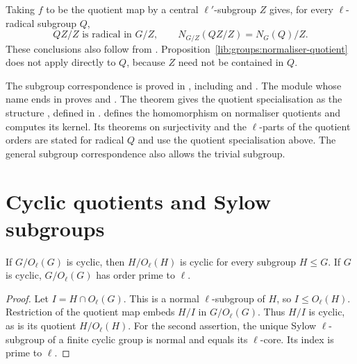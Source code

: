 Taking $f$ to be the quotient map by a central $\ell'$-subgroup $Z$
gives, for every $\ell$-radical subgroup $Q$,
\[
 QZ/Z\text{ is radical in }G/Z,
 \qquad N_{G/Z}(QZ/Z)=N_G(Q)/Z.
\]
These conclusions also follow from
\cite[Lemma~2.3(c) and its proof]{NavarroTiep2011}.
Proposition~\ref{lib:groups:normaliser-quotient} does not apply directly
to $Q$, because $Z$ need not be contained in $Q$.

\begin{implementation}
The subgroup correspondence is proved in
,
including  and
. The module whose name ends in
 proves
 and
. The theorem
 gives the quotient specialisation
as the structure
, defined in
.
defines the homomorphism  on normaliser quotients and computes
its kernel. Its theorems on surjectivity and the $\ell$-parts of the
quotient orders are stated for radical $Q$ and use the quotient
specialisation above. The general subgroup correspondence also allows
the trivial subgroup.
\end{implementation}

\section{Cyclic quotients and Sylow subgroups}

\begin{proposition}
\label{lib:groups:hypoelementary}
If $G/O_\ell(G)$ is cyclic, then $H/O_\ell(H)$ is cyclic for every
subgroup $H\leq G$. If $G$ is cyclic, $G/O_\ell(G)$ has order prime
to $\ell$.
\end{proposition}
\begin{proof}
Let $I=H\cap O_\ell(G)$. This is a normal $\ell$-subgroup of $H$,
so $I\leq O_\ell(H)$. Restriction of the quotient map embeds $H/I$
in $G/O_\ell(G)$. Thus $H/I$ is cyclic, as is its quotient
$H/O_\ell(H)$. For the second assertion, the unique Sylow $\ell$-subgroup
of a finite cyclic group is normal and equals its $\ell$-core. Its index
is prime to $\ell$.
\end{proof}

